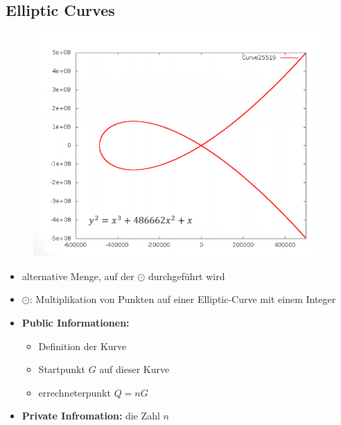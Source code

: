 \subsection{Elliptic Curves}
\begin{figure}[H]
	\begin{center}
		\includegraphics[scale=0.5]{Resources/EC1}
		\caption{}
		\label{fig:EC1}
	\end{center}
\end{figure}
\begin{itemize}
	\item alternative Menge, auf der $\odot$ durchgeführt wird
	\item $\odot$: Multiplikation von Punkten auf einer Elliptic-Curve mit einem Integer
	\item \textbf{Public Informationen:}
	\begin{itemize}
	\item Definition der Kurve
	\item Startpunkt $G$ auf dieser Kurve
	\item errechneterpunkt $Q = nG$
	\end{itemize}
	\item \textbf{Private Infromation:} die Zahl $n$
\end{itemize}
